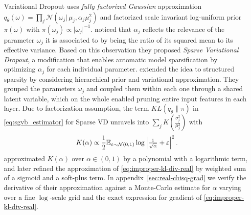 \documentclass[a4paper,10pt,twocolumn]{article}
\begin{document}
Variational Dropout uses \emph{fully factorized Gaussian} approximation $
  q_\theta(\omega)
    = \prod_j \mathcal{N}(\omega_j \vert\, \mu_j, \alpha_j \mu_j^2)
$ and factorized scale invariant log-uniform prior $\pi(\omega)$ with $
  \pi(\omega_j) \propto \lvert \omega_j \rvert^{-1}
$. \citet{molchanov_variational_2017} noticed that $\alpha_j$ reflects the relevance of the
parameter $\omega_j$ it is associated to by being the ratio of its squared mean to its
effective variance. Based on this observation they proposed \emph{Sparse Variational Dropout},
a modification that enables automatic model sparsification by optimizing $\alpha_j$ for each
individual parameter. \citet{louizos_bayesian_2017} extended the idea to structured sparsity
by considering hierarchical prior and variational approximation. They grouped the parameters
$\omega_j$ and coupled them within each one through a shared latent variable, which on the
whole enabled pruning entire input features in each layer.
%
Due to factorization assumption, the term $KL(q_\theta \| \pi)$ in \eqref{eq:sgvb_estimator}
for Sparse VD unravels into $
  \sum_j K(\tfrac{\sigma^2_{j}}{\mu_{j}^2})
$ with
\begin{equation}  \label{eq:improper-kl-div-real}
  K(\alpha)
    \propto \frac12 \mathbb{E}_{\varepsilon \sim \mathcal{N}(0, 1)}
        \log{\Bigl\lvert \tfrac1{\sqrt{\alpha}} + \varepsilon \Bigr\rvert^2}
  \,.
\end{equation}
\citet{kingma_variational_2015} approximated $K(\alpha)$ over $\alpha \in (0, 1)$ by a
polynomial with a logarithmic term, and later \citet{molchanov_variational_2017} refined
the approximation of \eqref{eq:improper-kl-div-real} by weighted sum of a sigmoid and a
soft-plus term.
In appendix~\ref{sec:real-chisq-grad} we verify the derivative of their approximation
against a Monte-Carlo estimate for $\alpha$ varying over a fine $\log$-scale grid and
the exact expression for gradient of \eqref{eq:improper-kl-div-real}.
\end{document}
